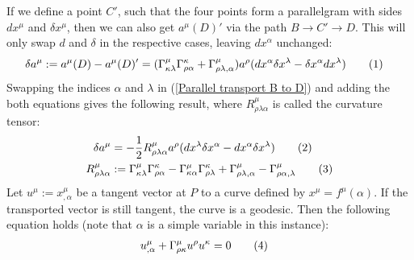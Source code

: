 \documentclass[a4paper,12pt]{article}
\newcommand\numberthis{\addtocounter{equation}{1}\tag{\theequation}}
\begin{document}
If we define a point $C'$, such that the four points form a parallelgram with sides $dx^\mu$ and $\delta x^\mu$, then we can also get $a^\mu(D)'$ via the path $B\rightarrow C'\rightarrow D$. This will only swap $d$ and $\delta$ in the respective cases, leaving $dx^\alpha$ unchanged:
\begin{align*}
\delta a^\mu &:=a^\mu(D)-a^\mu(D)'=(\Gamma^\mu_{\kappa\lambda}\Gamma^\kappa_{\rho\alpha}+\Gamma^\mu_{\rho\lambda,\alpha})a^\rho (dx^\alpha\delta x^\lambda -\delta x^\alpha dx^\lambda)\numberthis\label{Parallel transport B to D}
\end{align*}
Swapping the indices $\alpha$ and $\lambda$ in (\ref{Parallel transport B to D}) and adding the both equations gives the following result, where $R^\mu_{\rho\lambda\alpha}$ is called the curvature tensor:
\begin{align*}
\delta a^\mu &=-\frac{1}{2}R^\mu_{\rho\lambda\alpha} a^\rho(dx^\lambda\delta x^\alpha- dx^\alpha\delta x^\lambda)\numberthis\label{Parallel transport with curvature tensor}\\
R^\mu_{\rho\lambda\alpha}&:=\Gamma^\mu_{\kappa\lambda}\Gamma^\kappa_{\rho\alpha}-\Gamma^\mu_{\kappa\alpha}\Gamma^\kappa_{\rho\lambda}+\Gamma^\mu_{\rho\lambda,\alpha}-\Gamma^\mu_{\rho\alpha,\lambda}\numberthis\label{Curvature tensor}
\end{align*}
Let $u^\mu:=x^\mu_{,\alpha}$ be a tangent vector at $P$ to a curve defined by $x^\mu=f^\mu(\alpha)$. If the transported vector is still tangent, the curve is a geodesic. Then the following equation holds (note that $\alpha$ is a simple variable in this instance):
\begin{align*}
u^\mu_{,\alpha}+\Gamma^\mu_{\rho\kappa}u^\rho u^\kappa &=0\numberthis\label{Geodesic equation}
\end{align*}
\end{document}
